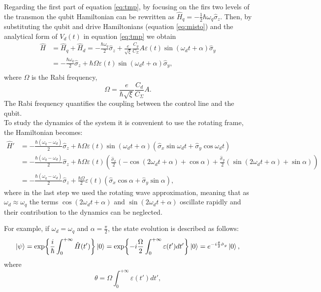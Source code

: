 Regarding the first part of equation \ref{eq:tmp}, by focusing on the firs two levels of the transmon the qubit Hamiltonian can be rewritten as $\hat{H}_q = -\frac{1}{2}\hbar\omega_q\hat{\sigma}_z$.
Then, by substituting the qubit and drive Hamiltonians (equation \ref{eq:misto}) and the analytical form of $V_d(t)$ in equation \ref{eq:tmp} we obtain
\begin{align}
    \hat{H} &= \hat{H}_q + \hat{H}_d = -\frac{\hbar \omega_q}{2} \hat{\sigma}_z + \frac{e}{\sqrt{\xi}} \frac{C_g}{C_{\Sigma}} A \varepsilon(t) \sin(\omega_d t + \alpha) \hat{\sigma}_y\\
    &= -\frac{\hbar \omega_q}{2} \hat{\sigma}_z + \hbar \Omega \varepsilon(t) \sin(\omega_d t + \alpha) \hat{\sigma}_y, \\ \label{eq:interaction_hamiltonian}
\end{align} 
where $\Omega$ is the Rabi frequency, 
\begin{equation}\label{eq:Rabi_frequency}
    \Omega = \frac{e}{\hbar\sqrt{\xi}}\frac{C_d}{C_\Sigma}A.
\end{equation}
The Rabi frequency quantifies the coupling between the control line and the qubit.\\
To study the dynamics of the system it is convenient to use the rotating frame, the Hamiltonian becomes:
\begin{align}
    \hat{H}' &= -\frac{\hbar (\omega_q - \omega_d)}{2} \hat{\sigma}_z + \hbar \Omega \varepsilon(t) \sin(\omega_d t + \alpha)\left( \hat{\sigma}_x \sin \omega_d t + \hat{\sigma}_y \cos \omega_d t \right)\\
    &= -\frac{\hbar (\omega_q - \omega_d)}{2} \hat{\sigma}_z + \hbar \Omega \varepsilon(t)\left(\frac{\hat{\sigma}_x}{2} \left( -\cos(2\omega_d t + \alpha) + \cos \alpha \right) + \frac{\hat{\sigma}_y}{2} \left( \sin(2\omega_d t + \alpha) + \sin \alpha \right)\right)\\
    &=  -\frac{\hbar (\omega_q - \omega_d)}{2} \hat{\sigma}_z + \frac{\hbar \Omega}{2} \varepsilon(t) \left( \hat{\sigma}_x \cos \alpha + \hat{\sigma}_y \sin \alpha \right),
\end{align}
where in the last step we used the rotating wave approximation, meaning that as $\omega_d\approx\omega_q$ the terms $\cos(2\omega_d t + \alpha)$ and $\sin(2\omega_d t + \alpha)$ oscillate rapidly and their contribution to the dynamics can be neglected.

For example, if $\omega_d = \omega_q$ and $\alpha=\frac{\pi}{2}$, the state evolution is described as follows:
\begin{align}
    \ket{\psi} = \exp{\frac{i}{\hbar}\int_{0}^{+\infty} \hat{H}(t')}\ket{0} = \exp{-i\frac{\Omega}{2}\int_{0}^{+\infty}\varepsilon(t')dt'}\ket{0} = e^{-i\frac{\theta}{2}\hat{\sigma}_y}\ket{0},
\end{align}
where
\begin{equation}
    \theta = \Omega\int_{0}^{+\infty}\varepsilon(t')dt',
\end{equation}

